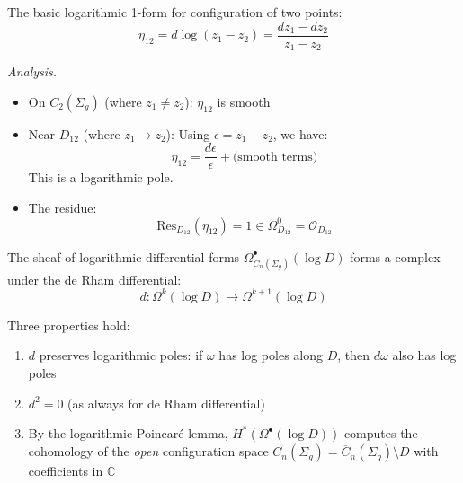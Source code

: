 \begin{example}\label{ex:log-form-two-points}
The basic logarithmic 1-form for configuration of two points:
\[\eta_{12} = d\log(z_1 - z_2) = \frac{dz_1 - dz_2}{z_1 - z_2}\]

\emph{Analysis.}
\begin{itemize}
\item On $C_2(\Sigma_g)$ (where $z_1 \neq z_2$): $\eta_{12}$ is smooth
\item Near $D_{12}$ (where $z_1 \to z_2$): Using $\epsilon = z_1 - z_2$, we have:
\[\eta_{12} = \frac{d\epsilon}{\epsilon} + \text{(smooth terms)}\]
This is a logarithmic pole.
\item The residue:
\[\text{Res}_{D_{12}}(\eta_{12}) = 1 \in \Omega^0_{D_{12}} = \mathcal{O}_{D_{12}}\]
\end{itemize}
\end{example}

\begin{theorem}\label{thm:log-complex}
The sheaf of logarithmic differential forms
$\Omega^\bullet_{\overline{C}_n(\Sigma_g)}(\log D)$
forms a complex under the de Rham differential:
\[d: \Omega^k(\log D) \to \Omega^{k+1}(\log D)\]

Three properties hold:
\begin{enumerate}
\item $d$ preserves logarithmic poles: if $\omega$ has log poles along $D$, then $d\omega$ also has log poles
\item $d^2 = 0$ (as always for de Rham differential)
\item By the logarithmic Poincar\'e lemma, $H^*(\Omega^\bullet(\log D))$ computes the cohomology of the \emph{open} configuration space $C_n(\Sigma_g) = \overline{C}_n(\Sigma_g) \setminus D$ with coefficients in $\mathbb{C}$
\end{enumerate}
\end{theorem}

